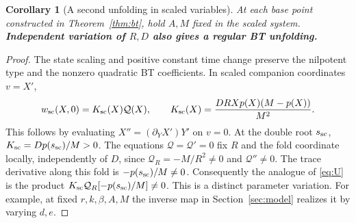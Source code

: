 \documentclass[12pt,a4paper,twoside,fleqn]{article}
\theoremstyle{journal}
\newtheorem{corollary}{Corollary}
\newcommand{\claim}[1]{{\normalfont\bfseries\boldmath #1}}
\newcommand{\Q}{\mathcal Q}
\begin{document}
\begin{corollary}[A second unfolding in scaled variables]\label{cor:scaledbt}
At each base point constructed in Theorem~\ref{thm:bt}, hold \(A,M\) fixed in the scaled system. \claim{Independent variation of \(R,D\) also gives a regular BT unfolding.}
\end{corollary}
\begin{proof}
The state scaling and positive constant time change preserve the nilpotent type and the nonzero quadratic BT coefficients. In scaled companion coordinates \(v=X'\),
\[
 w_{\rm sc}(X,0)=K_{\rm sc}(X)\Q(X),\qquad
 K_{\rm sc}(X)=\frac{DR Xp(X)(M-p(X))}{M^2}.
\]
This follows by evaluating \(X''=(\partial_Y X')Y'\) on \(v=0\). At the double root \(s_{\rm sc}\), \(K_{\rm sc}=Dp(s_{\rm sc})/M>0\). The equations \(\Q=\Q'=0\) fix \(R\) and the fold coordinate locally, independently of \(D\), since \(\Q_R=-M/R^2\ne0\) and \(\Q''\ne0\). The trace derivative along this fold is \(-p(s_{\rm sc})/M\ne0\). Consequently the analogue of \eqref{eq:U} is the product \(K_{\rm sc}\Q_R[-p(s_{\rm sc})/M]\ne0\). This is a distinct parameter variation. For example, at fixed \(r,k,\beta,A,M\) the inverse map in Section~\ref{sec:model} realizes it by varying \(d,e\).
\end{proof}
\end{document}

